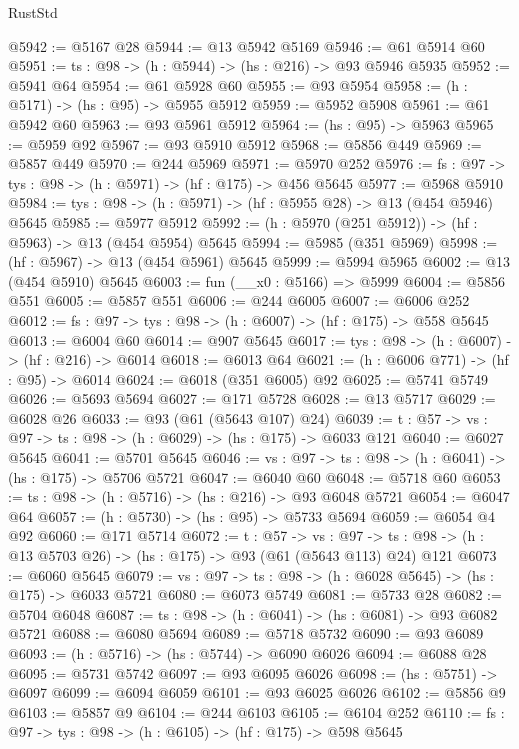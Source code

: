\begin{lexlean}{RustStd}
\begin{coremodule}
@5942 := @5167 @28
@5944 := @13 @5942 @5169
@5946 := @61 @5914 @60
@5951 := {ts : @98} -> (h : @5944) -> (hs : @216) -> @93 @5946 @5935
@5952 := @5941 @64
@5954 := @61 @5928 @60
@5955 := @93 @5954
@5958 := (h : @5171) -> (hs : @95) -> @5955 @5912
@5959 := @5952 @5908
@5961 := @61 @5942 @60
@5963 := @93 @5961 @5912
@5964 := (hs : @95) -> @5963
@5965 := @5959 @92
@5967 := @93 @5910 @5912
@5968 := @5856 @449
@5969 := @5857 @449
@5970 := @244 @5969
@5971 := @5970 @252
@5976 := {fs : @97} -> {tys : @98} -> (h : @5971) -> (hf : @175) -> @456 @5645
@5977 := @5968 @5910
@5984 := {tys : @98} -> (h : @5971) -> (hf : @5955 @28) -> @13 (@454 @5946) @5645
@5985 := @5977 @5912
@5992 := (h : @5970 (@251 @5912)) -> (hf : @5963) -> @13 (@454 @5954) @5645
@5994 := @5985 (@351 @5969)
@5998 := (hf : @5967) -> @13 (@454 @5961) @5645
@5999 := @5994 @5965
@6002 := @13 (@454 @5910) @5645
@6003 := fun (__x0 : @5166) => @5999
@6004 := @5856 @551
@6005 := @5857 @551
@6006 := @244 @6005
@6007 := @6006 @252
@6012 := {fs : @97} -> {tys : @98} -> (h : @6007) -> (hf : @175) -> @558 @5645
@6013 := @6004 @60
@6014 := @907 @5645
@6017 := {tys : @98} -> (h : @6007) -> (hf : @216) -> @6014
@6018 := @6013 @64
@6021 := (h : @6006 @771) -> (hf : @95) -> @6014
@6024 := @6018 (@351 @6005) @92
@6025 := @5741 @5749
@6026 := @5693 @5694
@6027 := @171 @5728
@6028 := @13 @5717
@6029 := @6028 @26
@6033 := @93 (@61 (@5643 @107) @24)
@6039 := {t : @57} -> {vs : @97} -> {ts : @98} -> (h : @6029) -> (hs : @175) -> @6033 @121
@6040 := @6027 @5645
@6041 := @5701 @5645
@6046 := {vs : @97} -> {ts : @98} -> (h : @6041) -> (hs : @175) -> @5706 @5721
@6047 := @6040 @60
@6048 := @5718 @60
@6053 := {ts : @98} -> (h : @5716) -> (hs : @216) -> @93 @6048 @5721
@6054 := @6047 @64
@6057 := (h : @5730) -> (hs : @95) -> @5733 @5694
@6059 := @6054 @4 @92
@6060 := @171 @5714
@6072 := {t : @57} ->
  {vs : @97} -> {ts : @98} -> (h : @13 @5703 @26) -> (hs : @175) -> @93 (@61 (@5643 @113) @24) @121
@6073 := @6060 @5645
@6079 := {vs : @97} -> {ts : @98} -> (h : @6028 @5645) -> (hs : @175) -> @6033 @5721
@6080 := @6073 @5749
@6081 := @5733 @28
@6082 := @5704 @6048
@6087 := {ts : @98} -> (h : @6041) -> (hs : @6081) -> @93 @6082 @5721
@6088 := @6080 @5694
@6089 := @5718 @5732
@6090 := @93 @6089
@6093 := (h : @5716) -> (hs : @5744) -> @6090 @6026
@6094 := @6088 @28
@6095 := @5731 @5742
@6097 := @93 @6095 @6026
@6098 := (hs : @5751) -> @6097
@6099 := @6094 @6059
@6101 := @93 @6025 @6026
@6102 := @5856 @9
@6103 := @5857 @9
@6104 := @244 @6103
@6105 := @6104 @252
@6110 := {fs : @97} -> {tys : @98} -> (h : @6105) -> (hf : @175) -> @598 @5645

\end{coremodule}
\end{lexlean}
